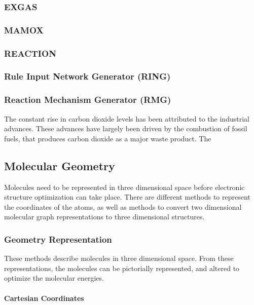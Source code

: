 \documentclass[12pt]{article}
\begin{document}
\subsubsection{EXGAS}
\subsubsection{MAMOX}
\subsubsection{REACTION}
\subsubsection{Rule Input Network Generator (RING)}
\subsubsection{Reaction Mechanism Generator (RMG)}

The constant rise in carbon dioxide levels has been attributed to the industrial advances. These advances have largely been driven by the combustion of fossil fuels, that produces carbon dioxide as a major waste product. The 

\subsection{Molecular Geometry}

Molecules need to be represented in three dimensional space before electronic structure optimization can take place. There are different methods to represent the coordinates of the atoms, as well as methods to convert two dimensional molecular graph representations to three dimensional structures.

\subsubsection{Geometry Representation}

These methods describe molecules in three dimensional space. From these representations, the molecules can be pictorially represented, and altered to optimize the molecular energies.

\paragraph{Cartesian Coordinates}\mbox{}\\
\end{document}
